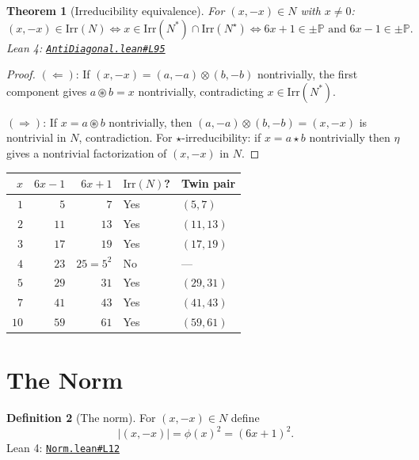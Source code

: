 \documentclass[11pt,a4paper]{amsart}
\theoremstyle{plain}
\newtheorem{theorem}{Theorem}[section]
\theoremstyle{definition}
\newtheorem{definition}[theorem]{Definition}
\theoremstyle{remark}
\newcommand{\mstar}{\mathbin{\circledast}}  %
\newcommand{\sstar}{\mathbin{\star}}        %
\newcommand{\tens}{\mathbin{\otimes}}       %
\newcommand{\PP}{\mathbb{P}}               %
\newcommand{\Irr}{\mathrm{Irr}}
\newcommand{\Nstar}{N^*}
\newcommand{\Nsstar}{N^\star}
\newcommand{\phii}{\phi}                   %
\newcommand{\etaa}{\eta}                   %
\newcommand{\GH}{https://github.com/FruitfulApproach/Lean4TPC/blob/main}
\begin{document}
\begin{theorem}[Irreducibility equivalence]
\label{thm:irred-equiv}
For $(x,-x) \in N$ with $x \neq 0$:
\[
(x,-x) \in \Irr(N) \iff x \in \Irr(\Nstar) \cap \Irr(\Nsstar)
\iff 6x+1 \in \pm\PP \text{ and } 6x-1 \in \pm\PP.
\]
\textnormal{Lean 4:} \href{\GH/TPC/AntiDiagonal.lean\#L95}{\texttt{AntiDiagonal.lean\#L95}}
\end{theorem}

\begin{proof}
$(\Leftarrow)$: If $(x,-x) = (a,-a) \tens (b,-b)$ nontrivially, the first
component gives $a \mstar b = x$ nontrivially, contradicting
$x \in \Irr(\Nstar)$.

$(\Rightarrow)$: If $x = a \mstar b$ nontrivially, then
$(a,-a) \tens (b,-b) = (x,-x)$ is nontrivial in $N$, contradiction.
For $\sstar$-irreducibility: if $x = a \sstar b$ nontrivially then
$\etaa$ gives a nontrivial factorization of $(x,-x)$ in $N$.
\end{proof}

\begin{center}
\begin{tabular}{rrrll}
\toprule
$x$ & $6x-1$ & $6x+1$ & $\Irr(N)$? & Twin pair \\
\midrule
$1$  & $5$  & $7$  & Yes & $(5,7)$ \\
$2$  & $11$ & $13$ & Yes & $(11,13)$ \\
$3$  & $17$ & $19$ & Yes & $(17,19)$ \\
$4$  & $23$ & $25=5^2$ & No & --- \\
$5$  & $29$ & $31$ & Yes & $(29,31)$ \\
$7$  & $41$ & $43$ & Yes & $(41,43)$ \\
$10$ & $59$ & $61$ & Yes & $(59,61)$ \\
\bottomrule
\end{tabular}
\end{center}

\section{The Norm}

\begin{definition}[The norm]
\label{def:norm}
For $(x,-x) \in N$ define
\[
|(x,-x)| = \phii(x)^2 = (6x+1)^2.
\]
\textnormal{Lean 4:} \href{\GH/TPC/Norm.lean\#L12}{\texttt{Norm.lean\#L12}}
\end{definition}
\end{document}
